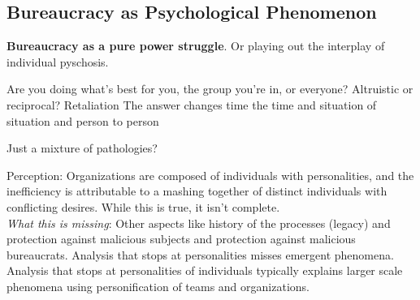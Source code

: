 \subsection{Bureaucracy as Psychological Phenomenon}

\textbf{Bureaucracy as a pure power struggle}. Or playing out the interplay of individual pyschosis. 

Are you doing what's best for you, the group you're in, or everyone?
Altruistic or reciprocal? Retaliation
The answer changes time the time and situation of situation and person to person

Just a mixture of pathologies?

Perception: Organizations are composed of individuals with personalities, and the inefficiency is attributable to a mashing together of distinct individuals with conflicting desires.
While this is true, it isn't complete. \\
\textit{What this is missing}: Other aspects like history of the processes (legacy) and protection against malicious subjects and protection against malicious bureaucrats. Analysis that stops at personalities misses emergent phenomena. Analysis that stops at personalities of individuals typically explains larger scale phenomena using personification of teams and organizations. 